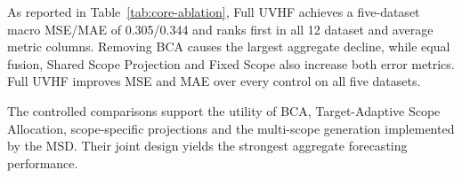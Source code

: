 \documentclass[final,3p,times]{elsarticle}
\begin{document}
\begin{table}[t]
\centering
\caption{UVHF ablations (four-horizon mean MSE/MAE). Bold and underline indicate best and second-best values.}
\label{tab:core-ablation}
\end{table}


As reported in Table~\ref{tab:core-ablation}, Full UVHF achieves a five-dataset macro MSE/MAE of 0.305/0.344 and ranks first in all 12 dataset and average metric columns. Removing BCA causes the largest aggregate decline, while equal fusion, Shared Scope Projection and Fixed Scope also increase both error metrics. Full UVHF improves MSE and MAE over every control on all five datasets.

The controlled comparisons support the utility of BCA, Target-Adaptive Scope Allocation, scope-specific projections and the multi-scope generation implemented by the MSD. Their joint design yields the strongest aggregate forecasting performance.
\end{document}
